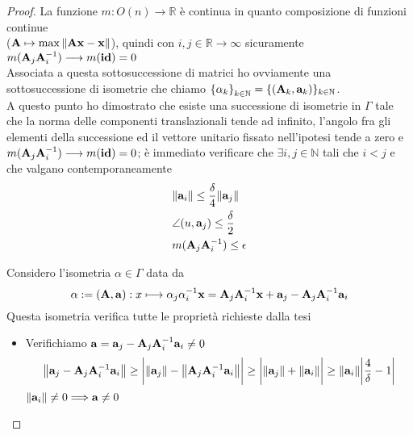 \documentclass[a4paper]{book}
\begin{document}
\begin{proof}
\newpage
La funzione  $ m: O(n) \longrightarrow \mathbb{R}$  è continua in quanto composizione di funzioni continue \\ ($ \vb{A} \mapsto \max{\norm{\vb{Ax-x}}} $), quindi con $i,j \in \mathbb{R} \longrightarrow \infty $ sicuramente $m(\vb{A}_j \vb{A}^{-1}_i) \longrightarrow m(\vb{id}) = 0 $ \\
Associata a questa sottosuccessione di matrici ho ovviamente una sottosuccessione di isometrie che chiamo ${ \{\alpha_k \}}_{k \in \mathbb{N}} = \{ (\vb{A}_k , \vb{a}_k ) \}_{k \in \mathbb{N}}$. \\
A questo punto ho dimostrato che esiste una successione di isometrie in $\Gamma$ tale che la norma delle componenti translazionali tende ad infinito, l'angolo fra gli elementi della successione ed il vettore unitario fissato nell'ipotesi tende a zero e $m(\vb{A}_j \vb{A}^{-1}_i) \longrightarrow m(\vb{id}) = 0 $; è immediato verificare che $\exists i,j \in \mathbb{N} $  tali che  $ i < j$  e che valgano contemporaneamente
\begin{equation}
\label{eq:bib1}
\begin{split}
& \norm{\vb{a}_i} \leq \frac{\delta}{4}\norm{\vb{a}_j} \\
& \angle(u, \vb{a}_j ) \leq \frac{\delta}{2} \\
& m( \vb{A}_j \vb{A}^{-1}_i ) \leq \epsilon  
\end{split}
\end{equation}


Considero l'isometria $\alpha \in \Gamma$ data da 
\[ \alpha := (\vb{A, a})  : x \longmapsto \alpha_j \alpha^{-1}_i \vb{x} = \vb{A}_j \vb{A}^{-1}_i \vb{x} + \vb{a}_j - \vb{A}_j \vb{A}^{-1}_i \vb{a}_i\]
Questa isometria verifica tutte le proprietà richieste dalla tesi

\begin{itemize}
\item Verifichiamo  $\vb{a}= \vb{a}_j - \vb{A}_j \vb{A}^{-1}_i \vb{a}_i \neq 0$ 
\[ \norm{\vb{a}_j - \vb{A}_j \vb{A}^{-1}_i \vb{a}_i} \geq \bigg| \norm{\vb{a}_j} - \norm{ \vb{A}_j \vb{A}^{-1}_i \vb{a}_i } \bigg| \geq \bigg| \norm{\vb{a}_j } + \norm{\vb{a}_i} \bigg| \geq \norm{\vb{a}_i} \bigg| \frac{4}{\delta} -1 \bigg| \]
$\norm{\vb{a}_i} \neq 0 \Longrightarrow \vb{a} \neq 0$
 

\end{itemize}
\end{proof}
\end{document}
